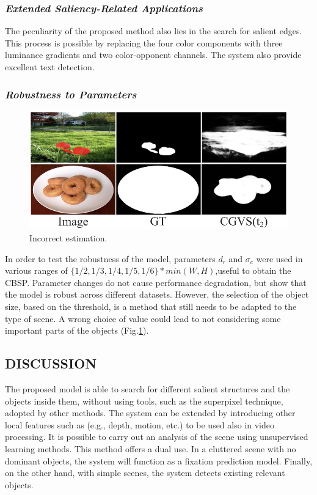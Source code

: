 \subsubsection{\emph{Extended Saliency-Related Applications}}
The peculiarity of the proposed method also lies in the search for salient 
edges. This process is possible by replacing the four color components with 
three luminance gradients and two color-opponent channels. The system also 
provide excellent text detection.

\subsubsection{\emph{Robustness to Parameters}}
\begin{figure}[htbp]
    \centering
    \includegraphics[width = 0.6 \linewidth]{images/paper1/bad threshold.png}
    \centering
    \caption{Incorrect estimation.}
    \label{fig: Incorrect}
\end{figure}
In order to test the robustness of the model, parameters $ d_r $ and $ \sigma_c $ were used 
in various ranges of $ \{ 1/2, 1/3, 1/4, 1/5, 1/6 \} * min(W,H) $,useful to obtain the 
CBSP. Parameter changes do not cause performance degradation, but show 
that the model is robust across different datasets. However, the 
selection of the object size, based on the threshold, is a method that still 
needs to be adapted to the type of scene. A wrong choice of value could lead 
to not considering some important parts of the objects (Fig.\ref{fig: Incorrect}).

\subsection{DISCUSSION}
The proposed model is able to search for different salient structures and the 
objects inside them, without using tools, such as the superpixel technique, 
adopted by other methods. The system can be extended by introducing 
other local features such as (e.g., depth, motion, etc.) to be used also 
in video processing. It is possible to carry out an analysis of the scene 
using unsupervised learning methods. This method offers a dual use. In 
a cluttered scene with no dominant objects, the system will function as a 
fixation prediction model. Finally, on the other hand, with simple scenes, 
the system detects existing relevant objects.